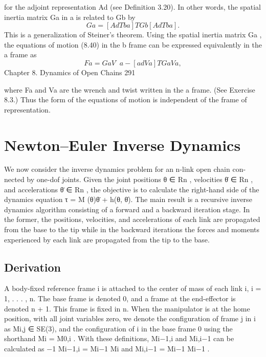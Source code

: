 \documentclass[12pt,a4paper]{article}
\begin{document}
for the adjoint representation Ad (see Definition 3.20). In other words, the
spatial inertia matrix Ga in {a} is related to Gb by
\begin{equation}
Ga = [AdTba ]T Gb [AdTba ].
\label{eq:8.42}
\end{equation}
This is a generalization of Steiner’s theorem.
   Using the spatial inertia matrix Ga , the equations of motion (8.40) in the
{b} frame can be expressed equivalently in the {a} frame as
\begin{equation}
Fa = Ga V̇a − [adVa ]T Ga Va ,
\label{eq:8.43}
\end{equation}
Chapter 8. Dynamics of Open Chains                                                                  291

where Fa and Va are the wrench and twist written in the {a} frame. (See
Exercise 8.3.) Thus the form of the equations of motion is independent of the
frame of representation.

\section{Newton–Euler Inverse Dynamics}
We now consider the inverse dynamics problem for an n-link open chain con-
nected by one-dof joints. Given the joint positions θ ∈ Rn , velocities θ̇ ∈ Rn ,
and accelerations θ̈ ∈ Rn , the objective is to calculate the right-hand side of the
dynamics equation
                               τ = M (θ)θ̈ + h(θ, θ̇).
The main result is a recursive inverse dynamics algorithm consisting of a forward
and a backward iteration stage. In the former, the positions, velocities, and
accelerations of each link are propagated from the base to the tip while in
the backward iterations the forces and moments experienced by each link are
propagated from the tip to the base.

\subsection{Derivation}
A body-fixed reference frame {i} is attached to the center of mass of each link
i, i = 1, . . . , n. The base frame is denoted {0}, and a frame at the end-effector
is denoted {n + 1}. This frame is fixed in {n}.
     When the manipulator is at the home position, with all joint variables zero,
we denote the configuration of frame {j} in {i} as Mi,j ∈ SE(3), and the
configuration of {i} in the base frame {0} using the shorthand Mi = M0,i .
With these definitions, Mi−1,i and Mi,i−1 can be calculated as
                            −1
                  Mi−1,i = Mi−1 Mi              and        Mi,i−1 = Mi−1 Mi−1 .
\end{document}
